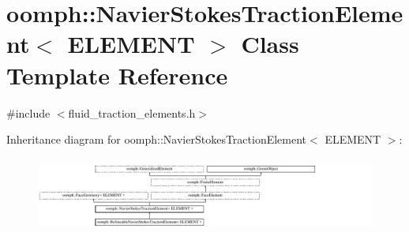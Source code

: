 \hypertarget{classoomph_1_1NavierStokesTractionElement}{}\section{oomph\+:\+:Navier\+Stokes\+Traction\+Element$<$ E\+L\+E\+M\+E\+NT $>$ Class Template Reference}
\label{classoomph_1_1NavierStokesTractionElement}


{\ttfamily \#include $<$fluid\+\_\+traction\+\_\+elements.\+h$>$}

Inheritance diagram for oomph\+:\+:Navier\+Stokes\+Traction\+Element$<$ E\+L\+E\+M\+E\+NT $>$\+:\begin{figure}[H]
\begin{center}
\leavevmode
\includegraphics[height=2.522522cm]{classoomph_1_1NavierStokesTractionElement}
\end{center}
\end{figure}
